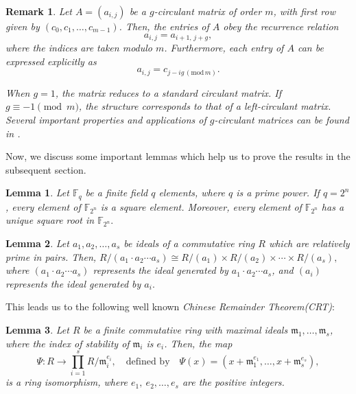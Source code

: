 \documentclass[12pt]{article}
\newtheorem{lemma}{Lemma}
\newtheorem{remark}{Remark}
\begin{document}
\begin{remark}
	Let \( A = (a_{i,j}) \) be a \( g \)-circulant matrix of order \( m \), with first row given by \( (c_0, c_1, \ldots, c_{m-1}) \). Then, the entries of \( A \) obey the recurrence relation
	\[
	a_{i,j} = a_{i+1,\,j+g},
	\]
	where the indices are taken modulo \( m \). Furthermore, each entry of \( A \) can be expressed explicitly as
	\[
	a_{i,j} = c_{j - ig \, (\mathrm{mod}\, m)}.
	\]
	
	When \( g = 1 \), the matrix reduces to a standard circulant matrix. If \( g \equiv -1 \pmod{m} \), the structure corresponds to that of a left-circulant matrix. Several important properties and applications of \( g \)-circulant matrices can be found in \cite{ablow1963roots, Davis1979Circulant}.
\end{remark}

Now, we discuss some important lemmas which help us to prove the results in the subsequent section.
\begin{lemma}\label{6Theorem4}\cite[Chapter 6, Theorem 6.18]{wan2011finite}
	Let $\mathbb{F}_q$ be a finite field $q$ elements, where $q$ is a prime power. If $q=2^n$, every element of $\mathbb{F}_{2^n}$ is a square element. Moreover, every element of $\mathbb{F}_{2^n}$ has a unique square root in $\mathbb{F}_{2^n}.$
\end{lemma}
\begin{lemma}\cite[Lemma 2.5 ]{dougherty2017algebraic}\label{6Lemma002}
Let $a_1, a_2, \ldots, a_s$ be ideals of a commutative ring $R$ which are relatively prime in pairs. Then,
	\(
	R / (a_1 \cdot a_2 \cdots a_s) \cong R / (a_1) \times R / (a_2) \times \cdots \times R / (a_s),\) where $(a_1\cdot a_2\cdots a_s)$ represents the ideal generated by $a_1\cdot a_2\cdots a_s$, and $(a_i)$ represents the ideal generated by $a_i.$ 
\end{lemma}
This leads us to the following well known \textit{Chinese Remainder Theorem(CRT)}:
\begin{lemma}\cite[Theorem 2.6 ]{dougherty2017algebraic}\label{6CRT}
	Let $R$ be a finite commutative ring with maximal ideals $\mathfrak{m}_1, \ldots, \mathfrak{m}_s$, where the index of stability of $\mathfrak{m}_i$ is $e_i$. Then, the map
	\[
	\Psi : R \to \prod_{i=1}^{s} R / \mathfrak{m}_i^{e_i}, \quad \text{defined by} \quad \Psi(x) = (x + \mathfrak{m}_1^{e_1}, \ldots, x + \mathfrak{m}_s^{e_s}),
	\]
	is a ring isomorphism, where $e_1,~e_2,\dots,e_s$ are the positive integers.
	
\end{lemma}
\end{document}
